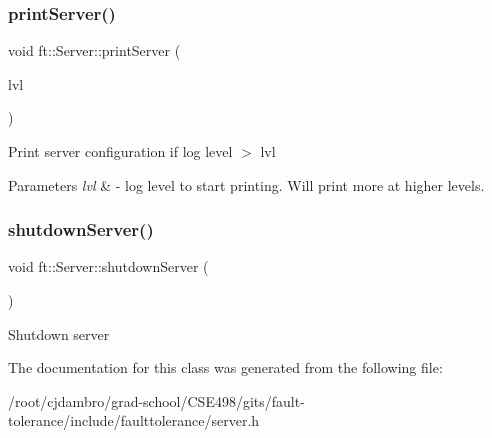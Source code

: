 \subsubsection{\texorpdfstring{print\+Server()}{printServer()}}
{\footnotesize\ttfamily void ft\+::\+Server\+::print\+Server (\begin{DoxyParamCaption}\item[{const Log\+Level}]{lvl }\end{DoxyParamCaption})}

Print server configuration if log level $>$ lvl


\begin{DoxyParams}{Parameters}
{\em lvl} & -\/ log level to start printing. Will print more at higher levels. \\
\hline
\end{DoxyParams}
\mbox{\label{classft_1_1Server_a4df01ccbcc6295e4930e3c65dedaa595}} 
\subsubsection{\texorpdfstring{shutdown\+Server()}{shutdownServer()}}
{\footnotesize\ttfamily void ft\+::\+Server\+::shutdown\+Server (\begin{DoxyParamCaption}{ }\end{DoxyParamCaption})}

Shutdown server 

The documentation for this class was generated from the following file\+:\begin{DoxyCompactItemize}
\item 
/root/cjdambro/grad-\/school/\+C\+S\+E498/gits/fault-\/tolerance/include/faulttolerance/server.\+h\end{DoxyCompactItemize}
